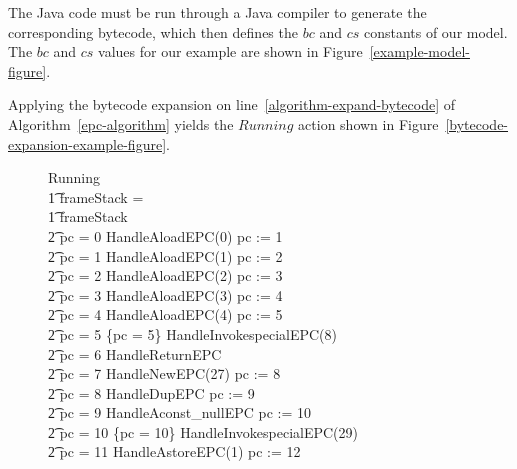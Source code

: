 The Java code must be run through a Java compiler to generate the
corresponding bytecode, which then defines the $bc$ and $cs$ constants
of our model.
The $bc$ and $cs$ values for our example are shown in
Figure~\ref{example-model-figure}.


Applying the bytecode expansion on
line~\ref{algorithm-expand-bytecode} of Algorithm~\ref{epc-algorithm}
yields the $Running$ action shown in
Figure~\ref{bytecode-expansion-example-figure}.
\begin{figure}[t]
  \setlength{\zedindent}{0cm}
  \setlength{\zedtab}{0.3cm}
  \setlength{\zedleftsep}{0.1cm}
  \begin{circus}
    Running \circdef \\
    \t1 \circif frameStack = \emptyset \circthen \Skip \\
    \t1 {} \circelse frameStack \neq \emptyset \circthen {} \\
    \t2 \circif pc = 0 \circthen HandleAloadEPC(0) \circseq pc := 1 \\
    \t2 {} \circelse pc = 1 \circthen HandleAloadEPC(1) \circseq pc := 2 \\
    \t2 {} \circelse pc = 2 \circthen HandleAloadEPC(2) \circseq pc := 3 \\
    \t2 {} \circelse pc = 3 \circthen HandleAloadEPC(3) \circseq pc := 4 \\
    \t2 {} \circelse pc = 4 \circthen HandleAloadEPC(4) \circseq pc := 5 \\
    \t2 {} \circelse pc = 5 \circthen \{pc = 5\} \circseq HandleInvokespecialEPC(8) \\
    \t2 {} \circelse pc = 6 \circthen HandleReturnEPC \\
    \t2 {} \circelse pc = 7 \circthen HandleNewEPC(27) \circseq pc := 8 \\
    \t2 {} \circelse pc = 8 \circthen HandleDupEPC \circseq pc := 9 \\
    \t2 {} \circelse pc = 9 \circthen HandleAconst\_nullEPC \circseq pc := 10 \\
    \t2 {} \circelse pc = 10 \circthen \{pc = 10\} \circseq HandleInvokespecialEPC(29) \\
    \t2 {} \circelse pc = 11 \circthen HandleAstoreEPC(1) \circseq pc := 12 \\

\end{circus}
\end{figure}
